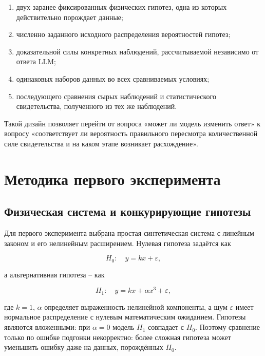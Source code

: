 \documentclass[a4paper,14pt]{extarticle}
\newcommand{\Hnull}{\ensuremath{H_0}}
\newcommand{\Hone}{\ensuremath{H_1}}
\begin{document}
\begin{enumerate}
  \item двух заранее фиксированных физических гипотез, одна из которых действительно порождает данные;
  \item численно заданного исходного распределения вероятностей гипотез;
  \item доказательной силы конкретных наблюдений, рассчитываемой независимо от ответа LLM;
  \item одинаковых наборов данных во всех сравниваемых условиях;
  \item последующего сравнения сырых наблюдений и статистического свидетельства, полученного из тех же наблюдений.
\end{enumerate}

Такой дизайн позволяет перейти от вопроса «может ли модель изменить ответ» к вопросу «соответствует ли вероятность правильного пересмотра количественной силе свидетельства и на каком этапе возникает расхождение».

\section{Методика первого эксперимента}

\subsection{Физическая система и конкурирующие гипотезы}

Для первого эксперимента выбрана простая синтетическая система с линейным законом и его нелинейным расширением. Нулевая гипотеза задаётся как

\begin{equation}
  \Hnull: \quad y = kx + \varepsilon,
\end{equation}

а альтернативная гипотеза -- как

\begin{equation}
  \Hone: \quad y = kx + \alpha x^3 + \varepsilon,
\end{equation}

где $k=1$, $\alpha$ определяет выраженность нелинейной компоненты, а шум $\varepsilon$ имеет нормальное распределение с нулевым математическим ожиданием. Гипотезы являются вложенными: при $\alpha=0$ модель \Hone{} совпадает с \Hnull. Поэтому сравнение только по ошибке подгонки некорректно: более сложная гипотеза может уменьшить ошибку даже на данных, порождённых \Hnull.
\end{document}

